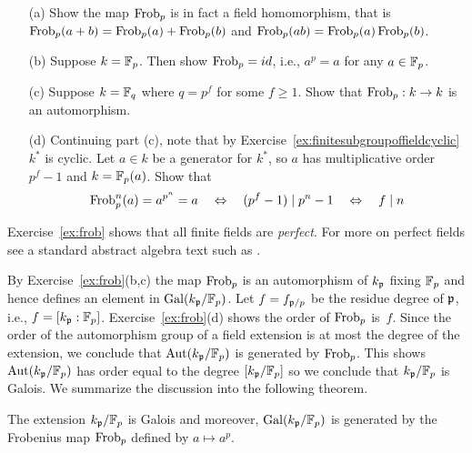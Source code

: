 \begin{exercise}\label{ex:frob}
\hfill
\begin{enumerate}
	\item[(a)]
	Show the map $\operatorname{Frob}_p$ is in fact a field homomorphism,
	that is $\operatorname{Frob}_p(a + b) = \operatorname{Frob}_p(a) + \operatorname{Frob}_p(b)$
	and $\operatorname{Frob}_p(ab) = \operatorname{Frob}_p(a)\operatorname{Frob}_p(b)$.
	
	\item[(b)]
	Suppose $k = \mathbb{F}_p$. Then show $\operatorname{Frob}_p = id$, i.e.,
	$a^p = a$ for any $a\in\mathbb{F}_p$.
	
	\item[(c)]
	Suppose $k = \mathbb{F}_{q}$ where $q=p^f$ for some $f\geq 1$. Show that $\operatorname{Frob}_p:k\to k$ is an automorphism.
	
	\item[(d)]
	Continuing part (c), note that by
	Exercise~\ref{ex:finitesubgroupoffieldcyclic}
	$k^*$ is cyclic. Let $a\in k$ be a generator for
	$k^*$, so $a$ has multiplicative order $p^f-1$ and $k = \mathbb{F}_p(a)$.
	Show that
	$$
	\operatorname{Frob}_p^n(a) = a^{p^n} = a
	\quad\Leftrightarrow\quad
	(p^f - 1) \mid p^n - 1
	\quad\Leftrightarrow\quad
	f \mid n
	$$
\end{enumerate}
\end{exercise}

\begin{remark}
	Exercise~\ref{ex:frob} shows that all finite fields
	are \emph{perfect}. For more on perfect fields see
	a standard abstract algebra text such as
	\cite{dummit2004abstract}.
\end{remark}

By Exercise~\ref{ex:frob}(b,c) the map $\operatorname{Frob}_p$ is an
automorphism of $k_{\mathfrak{p}}$ fixing $\mathbb{F}_p$ and hence defines
an element in $\operatorname{Gal}(k_{\mathfrak{p}}/\mathbb{F}_p)$. Let $f = f_{\mathfrak{p}/p}$ be the residue
degree of $\mathfrak{p}$, i.e., $f = [k_{\mathfrak{p}}:\mathbb{F}_p]$.
Exercise~\ref{ex:frob}(d) shows the order of $\operatorname{Frob}_p$ is~$f$.
Since the order of the automorphism group of a field extension
is at most the degree of the extension, we conclude that
$\operatorname{Aut}(k_{\mathfrak{p}}/\mathbb{F}_p)$ is generated by $\operatorname{Frob}_p$. This shows
$\operatorname{Aut}(k_{\mathfrak{p}}/\mathbb{F}_p)$ has order equal to the degree $[k_{\mathfrak{p}}/\mathbb{F}_p]$
so we conclude that $k_{\mathfrak{p}}/\mathbb{F}_p$ is Galois.
We summarize the discussion into the following theorem.

\begin{theorem}\label{thm:galoisgroupfinitefield}
	The extension $k_{\mathfrak{p}}/\mathbb{F}_p$ is Galois and moreover,
	$\operatorname{Gal}(k_{\mathfrak{p}}/\mathbb{F}_p)$ is generated by the Frobenius map
	$\operatorname{Frob}_p$ defined by $a\mapsto a^p$.
\end{theorem}

